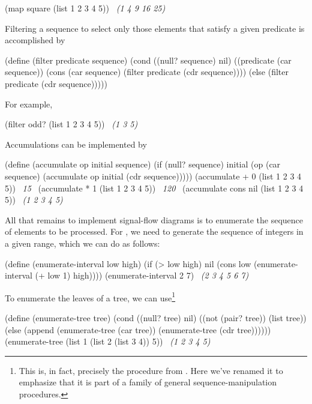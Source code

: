 \begin{codeBlock}
(map square (list 1 2 3 4 5))
~\textit{(1 4 9 16 25)}~
\end{codeBlock}

\noindent
Filtering a sequence to select only those elements that satisfy a given
predicate is accomplished by

\begin{codeBlock}
(define (filter predicate sequence)
  (cond ((null? sequence) nil)
        ((predicate (car sequence))
         (cons (car sequence)
               (filter predicate (cdr sequence))))
        (else (filter predicate (cdr sequence)))))
\end{codeBlock}

\noindent
For example,

\begin{codeBlock}
(filter odd? (list 1 2 3 4 5))
~\textit{(1 3 5)}~
\end{codeBlock}

\noindent
Accumulations can be implemented by

\begin{codeBlock}
(define (accumulate op initial sequence)
  (if (null? sequence)
      initial
      (op (car sequence)
          (accumulate op initial (cdr sequence)))))
(accumulate + 0 (list 1 2 3 4 5))
~\textit{15}~
(accumulate * 1 (list 1 2 3 4 5))
~\textit{120}~
(accumulate cons nil (list 1 2 3 4 5))
~\textit{(1 2 3 4 5)}~
\end{codeBlock}

\noindent
All that remains to implement signal-flow diagrams is to enumerate the sequence
of elements to be processed.  For , we need to generate the
sequence of integers in a given range, which we can do as follows:

\begin{codeBlock}
(define (enumerate-interval low high)
  (if (> low high)
      nil
      (cons low (enumerate-interval (+ low 1) high))))
(enumerate-interval 2 7)
~\textit{(2 3 4 5 6 7)}~
\end{codeBlock}

\noindent
To enumerate the leaves of a tree, we can use\footnote{This is, in fact,
precisely the  procedure from .  Here we've
renamed it to emphasize that it is part of a family of general
sequence-manipulation procedures.}

\begin{codeBlock}
(define (enumerate-tree tree)
  (cond ((null? tree) nil)
        ((not (pair? tree)) (list tree))
        (else (append (enumerate-tree (car tree))
                      (enumerate-tree (cdr tree))))))
(enumerate-tree (list 1 (list 2 (list 3 4)) 5))
~\textit{(1 2 3 4 5)}~
\end{codeBlock}

